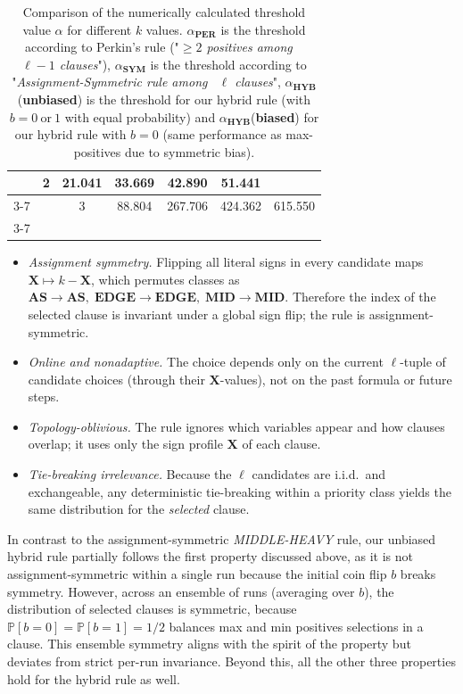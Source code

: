 \documentclass[11pt,reqno]{amsart}
\numberwithin{equation}{section}
\renewcommand{\vec}[1]{\boldsymbol{#1}}
\newcommand\vX{\vec X}
\newcommand\pr{\mathbb{P}}
\renewcommand\Pr{\pr}
\def\pr{{\mathbb P}}
\begin{document}
\begin{table}[h!]
\begin{tabular}{|c|c|c|c|c|c|c|}
			& 2 & 21.041 & 33.669 & 42.890 & 51.441 \\ \cline{3-7}
			& & 3 & 88.804 & 267.706 & 424.362 & 615.550 \\ \cline{3-7}
			\hline
		\end{tabular}
		\caption{\centering Comparison of the numerically calculated threshold value $\alpha$ for different $k$ values. 
			$\alpha_{\textbf{PER}}$ is the threshold according to Perkin's rule \cite{Perkins} ("\emph{$\geq 2$ positives among ~ $\ell-1$ clauses}"), 
			$\alpha_{\textbf{SYM}}$ is the threshold according to "\emph{Assignment-Symmetric rule among ~$\ell$ clauses}",
			$\alpha_{\mathbf{HYB}}$(\textbf{unbiased}) is the threshold for our hybrid rule (with $b=0 ~\mbox{or}~ 1$ with equal probability)
			and $\alpha_{\textbf{HYB}}$(\textbf{biased}) for our hybrid rule with $b=0$ (same performance as max-positives due to symmetric bias).}
		\label{tab:intro-compare}
	\end{table}
	
	\begin{itemize}
		\renewcommand{\labelitemi}{\scriptsize$\blacksquare$}
		\item \emph{Assignment symmetry.} Flipping all literal signs in every candidate maps $\vX\mapsto k-\vX$, which permutes classes as
		\(
		\textbf{AS}\to\textbf{AS},\;
		\textbf{EDGE}\to\textbf{EDGE},\;
		\textbf{MID}\to\textbf{MID}.
		\)
		Therefore the index of the selected clause is invariant under a global sign flip; the rule is assignment-symmetric.
		
		\item \emph{Online and nonadaptive.} The choice depends only on the current $\ell$-tuple of candidate choices (through their $\vX$-values), not on the past formula or future steps.
		
		\item \emph{Topology-oblivious.} The rule ignores which variables appear and how clauses overlap; it uses only the sign profile $\vX$ of each clause.
		
		\item \emph{Tie-breaking irrelevance.} Because the $\ell$ candidates are i.i.d.\ and exchangeable, any deterministic tie-breaking within a priority class yields the same distribution for the \emph{selected} clause.
		
	\end{itemize}
	In contrast to the assignment-symmetric \emph{MIDDLE-HEAVY} rule, our unbiased hybrid rule partially follows the first property discussed above, as it is not assignment-symmetric within a single run because the initial coin flip $b$ breaks symmetry. However, across an ensemble of runs (averaging over $b$), the distribution of selected clauses is symmetric, because 
	$\Pr[b=0]=\Pr[b=1]=1/2$ balances max and min positives selections in a clause.
	This ensemble symmetry aligns with the spirit of the property but deviates from strict per-run invariance.
	Beyond this, all the other three properties hold for the hybrid rule as well.  
\end{document}
